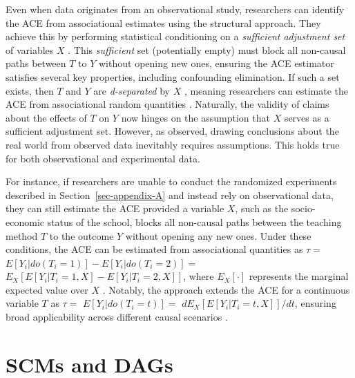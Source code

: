\documentclass[
  authoryear,
  review,
  1p]{elsarticle}
\begin{document}
Even when data originates from an observational study, researchers can
identify the ACE from associational estimates using the structural
approach. They achieve this by performing statistical conditioning on a
\emph{sufficient adjustment set} of variables \(X\)
\citep{Pearl_2009, Pearl_et_al_2016, Morgan_et_al_2014}. This
\emph{sufficient} set (potentially empty) must block all non-causal
paths between \(T\) to \(Y\) without opening new ones, ensuring the ACE
estimator satisfies several key properties, including confounding
elimination. If such a set exists, then \(T\) and \(Y\) are
\emph{d-separated} by \(X\) \citep{Pearl_2009}, meaning researchers can
estimate the ACE from associational random quantities
\citep{Morgan_et_al_2014}. Naturally, the validity of claims about the
effects of \(T\) on \(Y\) now hinges on the assumption that \(X\) serves
as a sufficient adjustment set. However, as
\citet[pp.~150]{Kohler_et_al_2019} observed, drawing conclusions about
the real world from observed data inevitably requires assumptions. This
holds true for both observational and experimental data.

For instance, if researchers are unable to conduct the randomized
experiments described in Section~\ref{sec-appendix-A} and instead rely
on observational data, they can still estimate the ACE provided a
variable \(X\), such as the socio-economic status of the school, blocks
all non-causal paths between the teaching method \(T\) to the outcome
\(Y\) without opening any new ones. Under these conditions, the ACE can
be estimated from associational quantities as \(\tau =\)
\(E[Y_{i}|do(T_{i}=1)]- E[Y_{i}|do(T_{i}=2)] =\)
\(E_{X}\left[ E[Y_{i}| T_{i}=1, X] - E[Y_{i}| T_{i}=2, X] \right]\),
where \(E_{X}[\cdot]\) represents the marginal expected value over \(X\)
\citep{Morgan_et_al_2014}. Notably, the approach extends the ACE for a
continuous variable \(T\) as \(\tau =\) \(E[Y_{i}|do(T_{i}=t)] =\)
\(d E_{X}\left[ E[Y_{i}| T_{i}=t, X]\right]/ dt\), ensuring broad
applicability across different causal scenarios
\citep[pp.~45]{Neal_2020}.

\section{SCMs and DAGs}\label{sec-appendix-C}

\newcommand{\dsep}{\perp\!\!\!\perp}
\newcommand{\ndsep}{\not\!\perp\!\!\!\perp}
\end{document}
